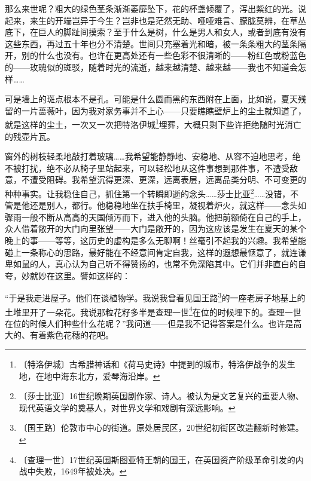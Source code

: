 \documentclass[12pt,UTF-8,openany]{ctexbook}
\begin{document}
\begin{large}
    那么来世呢？粗大的绿色茎条渐渐萎靡坠下，花的杯盏倾覆了，泻出紫红的光。说起来，来生的开端岂异于今生？岂非也是茫然无助、哑哑难言、朦胧莫辨，在草丛底下，在巨人的脚趾间摸索？至于什么是树，什么是男人和女人，或者到底有没有这些东西，再过五十年也分不清楚。世间只充塞着光和暗，被一条条粗大的茎条隔开，别的什么也没有。也许在更高处还有一些色彩不很清晰的——粉红色或粉蓝色的——玫瑰似的斑驳，随着时光的流逝，越来越清楚、越来越——我也不知道会怎样……
    
    可是墙上的斑点根本不是孔。可能是什么圆而黑的东西附在上面，比如说，夏天残留的一片蔷薇叶，因为我对家务事并不上心——只要瞧瞧壁炉上的尘土就知道了，就是这样的尘土，一次又一次把特洛伊城\footnote{〔特洛伊城〕古希腊神话和《荷马史诗》中提到的城市，特洛伊战争的发生地，在地中海东北方，爱琴海沿岸。}埋葬，大概只剩下些许拒绝随时光消亡的残壶片瓦。
    
    窗外的树枝轻柔地敲打着玻璃……我希望能静静地、安稳地、从容不迫地思考，绝不被打扰，绝不必从椅子里站起来，可以轻松地从这件事想到那件事，不遭受敌意，不遭受阻碍。我希望沉得更深、更深，远离表层，远离品类分明、不可变更的种种事实。让我稳住自己，抓住第一个转瞬即逝的念头……莎士比亚\footnote{〔莎士比亚〕16世纪晚期英国剧作家、诗人。被认为是文艺复兴的重要人物、现代英语文学的奠基人，对世界文学和戏剧有深远影响。}……没错，不管是他还是别人，都行。他稳稳地坐在扶手椅里，凝视着炉火，就这样——念头如骤雨一般不断从高高的天国倾泻而下，进入他的头脑。他把前额倚在自己的手上，众人借着敞开的大门向里张望——大门是敞开的，因为这应该是发生在夏天的某个晚上的事——等等，这历史的虚构是多么无聊啊！丝毫引不起我的兴趣。我希望能碰上一条称心的思路，最好能在不经意间肯定自我，这样的遐想最惬意了，就连谦卑如鼠的人，真心认为自己听不得赞扬的，也常不免深陷其中。它们并非直白的自夸，妙就妙在这里。譬如这样的：
    
    “于是我走进屋子。他们在谈植物学。我说我曾看见国王路\footnote{〔国王路〕伦敦市中心的街道。原处居民区，20世纪初街区改造翻新时修建。}的一座老房子地基上的土堆里开了一朵花。我说那粒花籽多半是查理一世\footnote{〔查理一世〕17世纪英国斯图亚特王朝的国王，在英国资产阶级革命引发的内战中失败，1649年被处决。}在位的时候埋下的。查理一世在位的时候人们种些什么花呢？”我问道——但是我不记得答案是什么。也许是高大的、有着紫色花穗的花吧。
    

\end{large}
\end{document}
